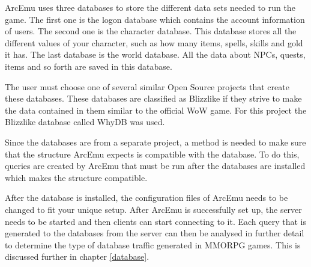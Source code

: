 ArcEmu uses three databases to store the different data sets needed to run the game. The first one is the logon database which contains the account information of users. The second one is the character database. This database stores all the different values of your character, such as how many items, spells, skills and gold it has. The last database is the world database. All the data about NPCs, quests, items and so forth are saved in this database.

The user must choose one of several similar Open Source projects that create these databases. These databases are classified as Blizzlike if they strive to make the data contained in them similar to the official WoW game. For this project the Blizzlike database called WhyDB was used. 

Since the databases are from a separate project, a method is needed to make sure that the structure ArcEmu expects is compatible with the database. To do this, queries are created by ArcEmu that must be run after the databases are installed which makes the structure compatible. 

After the database is installed, the configuration files of ArcEmu needs to be changed to fit your unique setup.
After ArcEmu is successfully set up, the server needs to be started and then clients can start connecting to it. Each query that is generated to the databases from the server can then be analysed in further detail to determine the type of database traffic generated in MMORPG games. This is discussed further in chapter \ref{database}.





